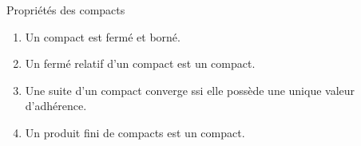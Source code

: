 \begin{proposition}{Propriétés des compacts}{}
    \begin{enumerate}
        \item Un compact est fermé et borné.
        \item Un fermé relatif d'un compact est un compact.
        \item Une suite d'un compact converge ssi elle possède une unique valeur d'adhérence. 
        \item Un produit fini de compacts est un compact.
    \end{enumerate}
\end{proposition}


